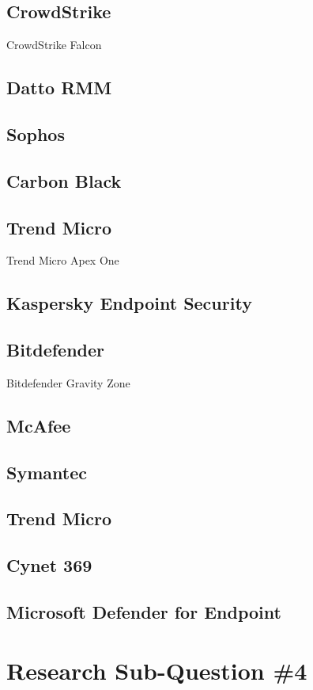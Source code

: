 \begin{multicols}{2}
      \subsection{CrowdStrike}
      CrowdStrike Falcon
      \subsection{Datto RMM}
      \subsection{Sophos}
      \subsection{Carbon Black}
      \subsection{Trend Micro}
      Trend Micro Apex One
      \subsection{Kaspersky Endpoint Security}
      \subsection{Bitdefender}
      Bitdefender Gravity Zone
      \subsection{McAfee}
      \subsection{Symantec}
      \subsection{Trend Micro}
      \subsection{Cynet 369}
      \subsection{Microsoft Defender for Endpoint}
      \section{Research Sub-Question \#4}
\end{multicols}